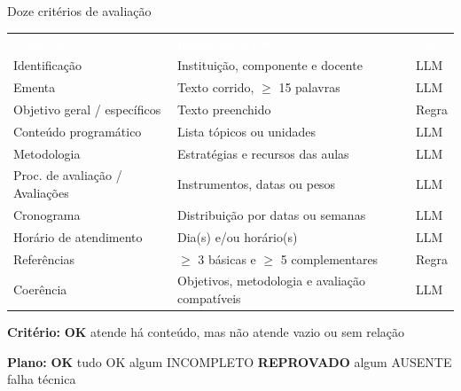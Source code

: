 \documentclass[aspectratio=169,11pt,xcolor=table]{beamer}
\newcommand{\ok}{{\bfseries\color{ifcverde}OK}}
\newcommand{\inc}{{\bfseries\color{ifcamarelo}INCOMPLETO}}
\newcommand{\aus}{{\bfseries\color{ifcvermelho}AUSENTE}}
\begin{document}
\begin{frame}{Doze critérios de avaliação}
  \centering\scriptsize
  \renewcommand{\arraystretch}{1.05}
      \begin{tabular}{L{4.2cm}L{7.2cm}L{1.2cm}}
        \textcolor{white}{\textbf{Critério}} & \textcolor{white}{\textbf{Regra para OK}} & \textcolor{white}{\textbf{Por}} \\
        Identificação          & Instituição, componente e docente & LLM \\
        Ementa                 & Texto corrido, $\geq$ 15 palavras & LLM \\
        Objetivo geral / específicos & Texto preenchido            & Regra \\
        Conteúdo programático  & Lista tópicos ou unidades         & LLM \\
        Metodologia            & Estratégias e recursos das aulas  & LLM \\
        Proc. de avaliação / Avaliações & Instrumentos, datas ou pesos & LLM \\
        Cronograma             & Distribuição por datas ou semanas & LLM \\
        Horário de atendimento & Dia(s) e/ou horário(s)            & LLM \\
        Referências            & $\geq$ 3 básicas e $\geq$ 5 complementares & Regra \\
        Coerência              & Objetivos, metodologia e avaliação compatíveis & LLM \\
      \end{tabular}
  \medskip
  \raggedright\scriptsize
  {\bfseries Critério:}\enspace
  \ok{} atende \quad \inc{} há conteúdo, mas não atende \quad \aus{} vazio ou sem relação\par\smallskip
  {\bfseries Plano:}\enspace
  \ok{} tudo OK  algum INCOMPLETO \quad
  {\bfseries\color{ifcvermelho}REPROVADO} algum AUSENTE  falha técnica
\end{frame}
\end{document}
